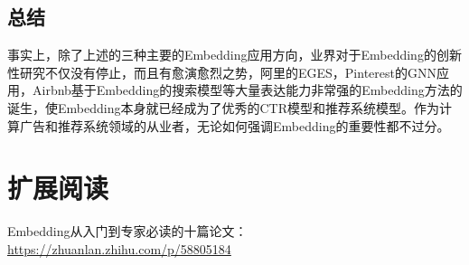 \documentclass[12pt]{article}
\begin{document}
\subsection{总结}
事实上，除了上述的三种主要的Embedding应用方向，业界对于Embedding的创新性研究不仅没有停止，而且有愈演愈烈之势，阿里的EGES，Pinterest的GNN应用，Airbnb基于Embedding的搜索模型等大量表达能力非常强的Embedding方法的诞生，使Embedding本身就已经成为了优秀的CTR模型和推荐系统模型。作为计算广告和推荐系统领域的从业者，无论如何强调Embedding的重要性都不过分。

\section{扩展阅读}
Embedding从入门到专家必读的十篇论文：\url{https://zhuanlan.zhihu.com/p/58805184}



\end{document}
